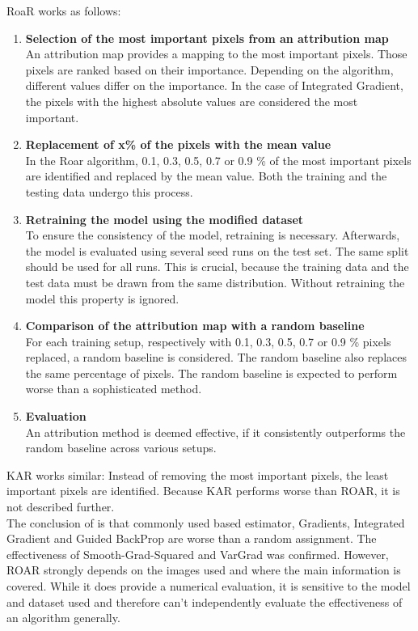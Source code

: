 RoaR  works as follows:
\begin{enumerate}
	\item \textbf{ Selection of the most important pixels from an attribution map}\\
	An attribution map provides a mapping to the most important pixels. Those pixels are ranked based on their importance. Depending on the algorithm, different values differ on the importance. In the case of Integrated Gradient, the pixels with the highest absolute values are considered the most important.
	\item \textbf{ Replacement of x\% of the pixels with the mean value}\\
	In the Roar algorithm, 0.1, 0.3, 0.5, 0.7 or 0.9 \% of the most important pixels are identified and replaced by the mean value. Both the training and the testing data undergo this process.
	\item \textbf{ Retraining the model using the modified dataset}\\
	To ensure the consistency of the model, retraining is necessary. Afterwards, the model is evaluated using several seed runs on the test set. The same split should be used for all runs.
	This is crucial, because the training data and the test data must be drawn from the same distribution. Without retraining the model this property is ignored.
	\item \textbf{ Comparison of the attribution map with a random baseline} \\
	For each training setup, respectively with 0.1, 0.3, 0.5, 0.7 or 0.9 \% pixels replaced, a random baseline is considered. The random baseline also replaces the same percentage of pixels. The random baseline is expected to perform worse than a sophisticated method.
	\item \textbf{ Evaluation} \\
	An attribution method is deemed effective, if it consistently outperforms the random baseline across various setups.
\end{enumerate}

KAR works similar: Instead of removing the most important pixels, the least important pixels are identified. Because KAR performs worse than ROAR, it is not described further.
\\
The conclusion of \cite{hooker2019benchmark} is that commonly used based estimator, Gradients, Integrated Gradient and Guided BackProp are worse than a random assignment. The effectiveness of Smooth-Grad-Squared and VarGrad was confirmed. However, ROAR strongly depends on the images used and where the main information is covered. While it does provide a numerical evaluation, it is sensitive to the model and dataset used and therefore can't independently evaluate the effectiveness of an algorithm generally.


